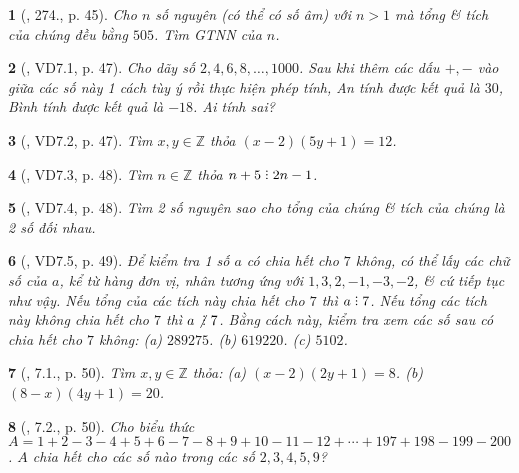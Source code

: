 \documentclass{article}
\newtheorem{baitoan}{}
\DeclareRobustCommand{\divby}{%
	\mathrel{\vbox{\baselineskip.65ex\lineskiplimit0pt\hbox{.}\hbox{.}\hbox{.}}}%
}
\begin{document}
\begin{baitoan}[\cite{Binh_Toan_6_tap_1}, 274., p. 45]
	Cho $n$ số nguyên (có thể có số âm) với $n > 1$ mà tổng \& tích của chúng đều bằng $505$. Tìm {\rm GTNN} của $n$.
\end{baitoan}

\begin{baitoan}[\cite{TLCT_THCS_Toan_6_so_hoc}, VD7.1, p. 47]
	Cho dãy số $2,4,6,8,\ldots,1000$. Sau khi thêm các dấu $+,-$ vào giữa các số này 1 cách tùy ý rồi thực hiện phép tính, An tính được kết quả là $30$, Bình tính được kết quả là $-18$. Ai tính sai?
\end{baitoan}

\begin{baitoan}[\cite{TLCT_THCS_Toan_6_so_hoc}, VD7.2, p. 47]
	Tìm $x,y\in\mathbb{Z}$ thỏa $(x - 2)(5y + 1) = 12$.
\end{baitoan}

\begin{baitoan}[\cite{TLCT_THCS_Toan_6_so_hoc}, VD7.3, p. 48]
	Tìm $n\in\mathbb{Z}$ thỏa $n + 5\divby2n - 1$.
\end{baitoan}

\begin{baitoan}[\cite{TLCT_THCS_Toan_6_so_hoc}, VD7.4, p. 48]
	Tìm 2 số nguyên sao cho tổng của chúng \& tích của chúng là 2 số đối nhau.
\end{baitoan}

\begin{baitoan}[\cite{TLCT_THCS_Toan_6_so_hoc}, VD7.5, p. 49]
	Để kiểm tra 1 số $a$ có chia hết cho $7$ không, có thể lấy các chữ số của $a$, kể từ hàng đơn vị, nhân tương ứng với $1,3,2,-1,-3,-2$, \& cứ tiếp tục như vậy. Nếu tổng của các tích này chia hết cho $7$ thì $a\divby7$. Nếu tổng các tích này không chia hết cho $7$ thì $a\not{\divby}\ 7$. Bằng cách này, kiểm tra xem các số sau có chia hết cho $7$ không: (a) $289275$. (b) $619220$. (c) $5102$.
\end{baitoan}

\begin{baitoan}[\cite{TLCT_THCS_Toan_6_so_hoc}, 7.1., p. 50]
	Tìm $x,y\in\mathbb{Z}$ thỏa: (a) $(x - 2)(2y + 1) = 8$. (b) $(8 - x)(4y + 1) = 20$.
\end{baitoan}

\begin{baitoan}[\cite{TLCT_THCS_Toan_6_so_hoc}, 7.2., p. 50]
	Cho biểu thức $A = 1 + 2 - 3 - 4 + 5 + 6 - 7 - 8 + 9 + 10 - 11 - 12 + \cdots + 197 + 198 - 199 - 200$. $A$ chia hết cho các số nào trong các số $2,3,4,5,9$?
\end{baitoan}
\end{document}

